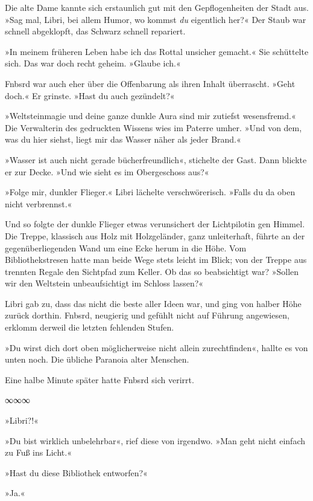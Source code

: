 Die alte Dame kannte sich erstaunlich gut mit den Gepflogenheiten der Stadt aus. »Sag mal, Libri, bei allem Humor, wo kommst \emph{du} eigentlich her?« Der Staub war schnell abgeklopft, das Schwarz schnell repariert.

»In meinem früheren Leben habe ich das Rottal unsicher gemacht.« Sie schüttelte sich. Das war doch recht geheim. »Glaube ich.«

Fnbsrd war auch eher über die Offenbarung als ihren Inhalt überrascht. »Geht doch.« Er grinste. »Hast du auch gezündelt?«

»Weltsteinmagie und deine ganze dunkle Aura sind mir zutiefst wesensfremd.« Die Verwalterin des gedruckten Wissens wies im Paterre umher. »Und von dem, was du hier siehst, liegt mir das Wasser näher als jeder Brand.«

»Wasser ist auch nicht gerade bücherfreundlich«, stichelte der Gast. Dann blickte er zur Decke. »Und wie sieht es im Obergeschoss aus?«

»Folge mir, dunkler Flieger.« Libri lächelte verschwörerisch. »Falls du da oben nicht verbrennst.«

Und so folgte der dunkle Flieger etwas verunsichert der Lichtpilotin gen Himmel. Die Treppe, klassisch aus Holz mit Holzgeländer, ganz unleiterhaft, führte an der gegenüberliegenden Wand um eine Ecke herum in die Höhe. Vom Bibliothekstresen hatte man beide Wege stets leicht im Blick; von der Treppe aus trennten Regale den Sichtpfad zum Keller. Ob das so beabsichtigt war? »Sollen wir den Weltstein unbeaufsichtigt im Schloss lassen?«

Libri gab zu, dass das nicht die beste aller Ideen war, und ging von halber Höhe zurück dorthin. Fnbsrd, neugierig und gefühlt nicht auf Führung angewiesen, erklomm derweil die letzten fehlenden Stufen.

»Du wirst dich dort oben möglicherweise nicht allein zurechtfinden«, hallte es von unten noch. Die übliche Paranoia alter Menschen.

Eine halbe Minute später hatte Fnbsrd sich verirrt.

\begin{center}
∞∞∞
\end{center}

»Libri?!«

»Du bist wirklich unbelehrbar«, rief diese von irgendwo. »Man geht nicht einfach zu Fuß ins Licht.«

»Hast du diese Bibliothek entworfen?«

»Ja.«

